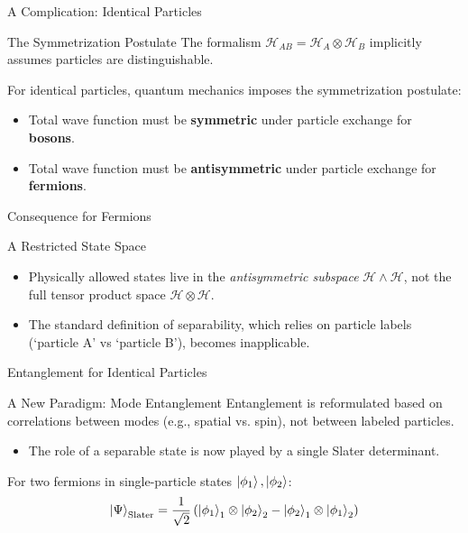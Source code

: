 \begin{frame}{A Complication: Identical Particles}
  \begin{block}{The Symmetrization Postulate}
    The formalism $\mathcal{H}_{AB} = \mathcal{H}_A \otimes \mathcal{H}_B$
    implicitly assumes particles are distinguishable.
    \pause

    For identical particles, quantum mechanics imposes the
    \alert{symmetrization postulate}:
    \begin{itemize}[<+->]
      \item Total wave function must be \textbf{symmetric} under particle
        exchange for \textbf{bosons}.
      \item Total wave function must be \textbf{antisymmetric} under particle
        exchange for \textbf{fermions}.
    \end{itemize}
  \end{block}
\end{frame}

\begin{frame}{Consequence for Fermions}
  \begin{alertblock}{A Restricted State Space}
    \begin{itemize}
      \item Physically allowed states live in the \emph{antisymmetric
        subspace} $\mathcal{H} \wedge \mathcal{H}$, not the full tensor
        product space $\mathcal{H} \otimes \mathcal{H}$.
      \pause
      \item The standard definition of separability, which relies on particle
        labels (`particle A' vs `particle B'), becomes inapplicable.
    \end{itemize}
  \end{alertblock}
\end{frame}

\begin{frame}{Entanglement for Identical Particles}
  \begin{block}{A New Paradigm: Mode Entanglement}
    Entanglement is reformulated based on correlations between modes (e.g.,
    spatial vs. spin), not between labeled particles.
    \pause
    \begin{itemize}
      \item The role of a separable state is now played by a single
        \alert{Slater determinant}.
    \end{itemize}
    \pause
    For two fermions in single-particle states $\ket{\phi_1}, \ket{\phi_2}$:
    \[
      \ket{\Psi}_{\text{Slater}} = \frac{1}{\sqrt{2}}
      \left( \ket{\phi_1}_1 \otimes \ket{\phi_2}_2 -
      \ket{\phi_2}_1 \otimes \ket{\phi_1}_2 \right)
    \]
  \end{block}
\end{frame}

